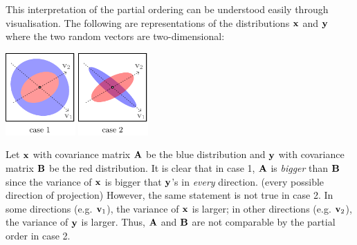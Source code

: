 \documentclass[a4paper]{article}
\begin{document}
\begin{multicols}{2}
This interpretation of the partial ordering can be understood easily through visualisation.
The following are representations of the distributions $\xx$ and $\yy$ where the
two random vectors are two-dimensional:
\begin{center}
	\includegraphics[width=0.2\textwidth]{figures/visual-1.pdf}
	\hspace{0.5em}
	\includegraphics[width=0.2\textwidth]{figures/visual-2.pdf}
\end{center}
Let $\xx$ with covariance matrix $\AA$ be the blue distribution and $\yy$ with
covariance matrix $\BB$ be the red distribution.
It is clear that in case 1, $\AA$ is \emph{bigger} than $\BB$ since the variance of $\xx$ is
bigger that $\yy$'s in \emph{every} direction. (every possible direction of projection)
However, the same statement is not true in case 2.
In some directions (e.g.\! $\vv_1$), the variance of $\xx$ is larger;
in other directions (e.g.\! $\vv_2$), the variance of $\yy$ is larger.
Thus, $\AA$ and $\BB$ are not comparable by the partial order in case 2.
\asDemonstrated

\end{multicols}
\end{document}

